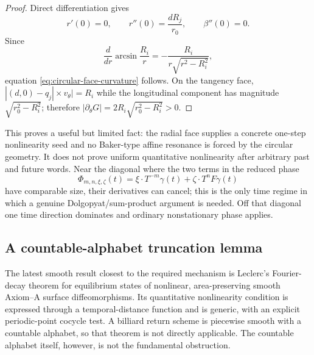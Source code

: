 \documentclass[11pt]{article}
\begin{document}
\begin{proof}
Direct differentiation gives
\[
 r'(0)=0,\qquad r''(0)=\frac{dR_j}{r_0},\qquad
 \beta''(0)=0.
\]
Since
\[
 \frac d{dr}\arcsin\frac{R_i}{r}
 =-\frac{R_i}{r\sqrt{r^2-R_i^2}},
\]
equation \eqref{eq:circular-face-curvature} follows.  On the tangency face,
$|(d,0)-q_j|\times v_\theta|=R_i$ while the longitudinal component has
magnitude $\sqrt{r_0^2-R_i^2}$; therefore
$|\partial_\theta G|=2R_i\sqrt{r_0^2-R_i^2}>0$.
\end{proof}

This proves a useful but limited fact: the radial face supplies a concrete
one-step nonlinearity seed and no Baker-type affine resonance is forced by
the circular geometry.  It does not prove uniform quantitative nonlinearity
after arbitrary past and future words.  Near the diagonal where the two
terms in the reduced phase
\begin{equation}
\label{eq:phase}
 \Phi_{m,n,\xi,\zeta}(t)
 =\xi\cdot T^{-m}\gamma(t)+\zeta\cdot T^nF\gamma(t)
\end{equation}
have comparable size, their derivatives can cancel;
this is the only time regime in which a genuine Dolgopyat/sum-product
argument is needed.  Off that diagonal one time direction dominates and
ordinary nonstationary phase applies.

\subsection{A countable-alphabet truncation lemma}

The latest smooth result closest to the required mechanism is Leclerc's
Fourier-decay theorem for equilibrium states of nonlinear, area-preserving
smooth Axiom--A surface diffeomorphisms.  Its quantitative nonlinearity
condition is expressed through a temporal-distance function and is generic,
with an explicit periodic-point cocycle test.  A billiard return scheme is
piecewise smooth with a countable alphabet, so that theorem is not directly
applicable.  The countable alphabet itself, however, is not the fundamental
obstruction.
\end{document}
